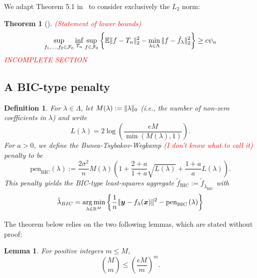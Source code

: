 \documentclass[11pt, letter paper]{article}
\newcommand{\1}{\mathmybb{1}}
\newtheorem{definition}{Definition}[section]
\newtheorem{theorem}[proposition]{Theorem}
\newtheorem{lemma}[proposition]{Lemma}
\DeclareMathOperator*{\argmin}{arg\,min}
\newcommand{\R}{\mathbb{R}}
\newcommand{\0}{\emptyset}
\newcommand{\E}{\mathbb{E}}
\newcommand{\paren}[1]{\left(#1 \right)}
\newcommand{\set}[1]{\left\{ #1 \right\}}
\newcommand{\norm}[1]{|\hspace{-1pt}|#1 |\hspace{-1pt}|}
\newcommand{\normsq}[1]{\norm{#1}^{2}}
\newcommand{\x}{\boldsymbol{x}}
\newcommand{\y}{\boldsymbol{y}}
\newcommand{\ftilde}[1]{\tilde{f}_{#1}}
\newcommand{\lambdahat}[1]{\hat{\lambda}_{#1}}
\newcommand{\penBIC}[1]{\mathrm{pen}_{\mathrm{BIC}}\paren{#1}}
\begin{document}
We adapt Theorem 5.1 in~\textcite{bunea_2007} to consider exclusively the \(L_{2}\) norm:

\begin{theorem}[\cite{bunea_2007}]\label{prop:buneath5.1}
    \textcolor{red}{(Statement of lower bounds)}
    \[\sup_{f_1, \ldots, f_2\in\mathcal{F}_{0}} \inf_{T_n}\sup_{f\in\mathcal{F}_0} \set{\E\normsq{f - T_n}_{2} - \min_{\lambda\in\Lambda}\normsq{f - \ftilde{\lambda}}_{2}} \geq c\psi_{n}\]
    \textcolor{red}{INCOMPLETE SECTION}
\end{theorem}

\subsection{A BIC-type penalty}
\begin{definition}
    For \(\lambda\in\Lambda\), let \(M(\lambda) := \norm{\lambda}_{0}\) (i.e., the number of non-zero coefficients in \(\lambda\)) and write
    \[L(\lambda) = 2\log\paren{\frac{eM}{\min(M(\lambda), 1)}}.\]
    For \(a>0\), we define the Bunea-Tsybakov-Wegkamp \textcolor{red}{(I don't know what to call it)} penalty to be
    \[\penBIC{\lambda} := \frac{2\sigma^{2}}{n}M(\lambda)\paren{1+\frac{2+a}{1+a}\sqrt{L(\lambda)} + \frac{1+a}{a}{L(\lambda)}}.\]
    This penalty yields the BIC-type least-squares aggregate \(\ftilde{\mathrm{BIC}} := \ftilde{\lambdahat{\mathrm{BIC}}}\) with 
    \[\lambdahat{BIC}=\argmin_{\lambda\in\R^{M}}\set{\frac{1}{n}\normsq{\y - f_{\lambda}(\x)} - \penBIC{\lambda}}\]
\end{definition}

The theorem below relies on the two following lemmas, which are stated without proof:

\begin{lemma}\label{lemm:binombound}
    For positive integers \(m \leq M\),
    \[\binom{M}{m} \leq \paren{\frac{eM}{m}}^m.\]
\end{lemma}
\end{document}
